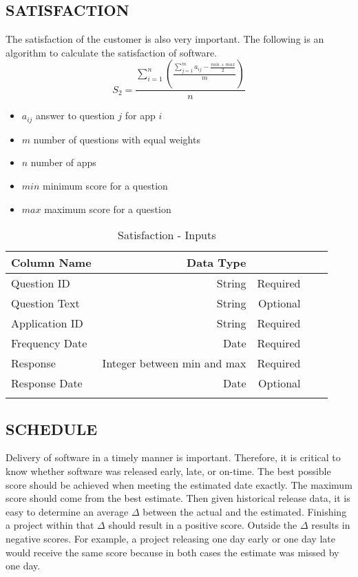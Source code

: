 \documentclass[SDSUThesis.tex]{subfiles}
\begin{document}
\subsection{SATISFACTION}
The satisfaction of the customer is also very important.  The following is an algorithm to calculate the satisfaction of software.
\[
    S_2 = \frac{\sum^n_{i=1}\left( \frac{\sum^m_{j=1}a_{ij}- \frac{min + max}{2}}{m}  \right)}{n}
\]

\begin{itemize}
\item $a_{i j}$ answer to question $j$ for app $i$
\item $m$ number of questions with equal weights
\item $n$ number of apps
\item $min$ minimum score for a question
\item $max$ maximum score for a question
\end{itemize}

\begin{longtable}{@{}l rr rr}

\toprule%
 \centering%
 {\bfseries Column Name}
 & {\bfseries Data Type}
 &  \\

\cmidrule[0.4pt](r{0.125em}){1-1}%
\cmidrule[0.4pt](lr{0.125em}){2-2}%
\cmidrule[0.4pt](l{0.125em}){3-3}%
\endhead

Question ID & String  & Required \\
\myrowcolour%
Question Text & String  & Optional \\
Application ID & String & Required \\
\myrowcolour%
Frequency Date & Date & Required \\
Response & Integer between min and max  & Required \\
\myrowcolour%
Response Date & Date & Optional \\

\bottomrule

\caption{Satisfaction - Inputs}
\label{tab:satisfaction}
\end{longtable}


\subsection{SCHEDULE}
Delivery of software in a timely manner is important.  Therefore, it is critical to know whether software was released early, late, or on-time.  
The best possible score should be achieved
            when meeting the estimated date exactly.  The maximum score
            should come from the best estimate.  Then given historical
            release data, it is easy to determine an 
            average $\Delta$ between the actual and the estimated.  
            Finishing a project within that $\Delta$ should result 
            in a positive score.  Outside the $\Delta$ results in
            negative scores.  For example, a project releasing
            one day early or one day late would receive the same score
            because in both cases the estimate was missed by one day.
\end{document}
